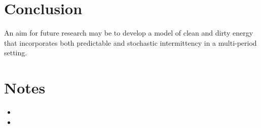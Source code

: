 \documentclass[11pt,a4paper]{extarticle}
\begin{document}
\section{Conclusion}

An aim for future research may be to develop a model of clean and dirty energy that incorporates both predictable and stochastic intermittency in a multi-period setting. 



\pagebreak



\pagebreak

\section{Notes}

\begin{itemize}
	\item 
	\item 
\end{itemize}

\pagebreak


%
%
%	
%	
	
	
	
\pagebreak
\end{document}
